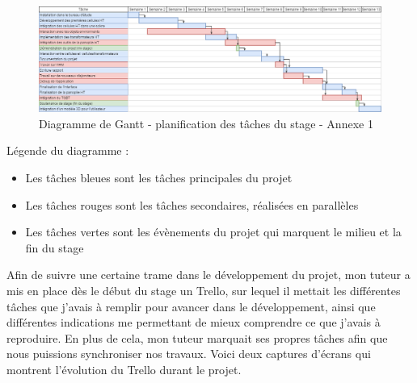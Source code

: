 \documentclass[a4paper]{article}
\begin{document}
     \begin{figure}[H]
        \centering 
        \includegraphics[scale=0.375]{img/GanttStage}
        \caption{Diagramme de Gantt - planification des tâches du stage - Annexe 1}
     \end{figure}

     Légende du diagramme : 
     \begin{itemize}
        \item Les tâches bleues sont les tâches principales du projet \\
        \item Les tâches rouges sont les tâches secondaires, réalisées en parallèles\\
        \item Les tâches vertes sont les évènements du projet qui marquent le milieu et la fin du stage \\
     \end{itemize}

     Afin de suivre une certaine trame dans le développement du projet, mon tuteur a mis en place dès le début du stage un Trello, sur lequel il mettait les différentes tâches que j'avais à remplir pour avancer dans le développement, ainsi que différentes indications me permettant de mieux comprendre ce que j'avais à reproduire. En plus de cela, mon tuteur marquait ses propres tâches afin que nous puissions synchroniser nos travaux. Voici deux captures d'écrans qui montrent l'évolution du Trello durant le projet. \\
\end{document}
